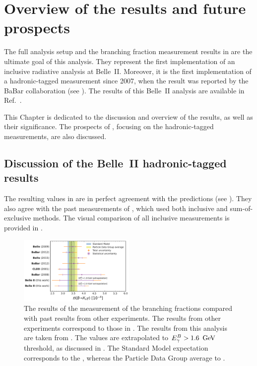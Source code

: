 \chapter{Overview of the results and future prospects}\label{ch:overview}

The full analysis setup and the branching fraction measurement results in 
are the ultimate goal of this analysis.
They represent the first implementation of an inclusive radiative analysis at Belle~II.
Moreover, it is the first implementation of a hadronic-tagged \BtoXsgamma measurement since 2007, 
when the result was reported by the BaBar collaboration (see ).
The results of this Belle~II analysis are available in Ref.~\cite{Belle-II:2022hys}.

This Chapter is dedicated to the discussion and overview of the results, as well as their significance.
The prospects of \BtoXsgamma, focusing on the hadronic-tagged measurements, are also discussed.

\section{Discussion of the Belle~II hadronic-tagged \texorpdfstring{\BtoXsgamma}{B->Xs gamma} results}\label{sec:result_discussion}

The resulting values in  are in perfect agreement with the \SM predictions (see ).
They also agree with the past measurements of \BtoXsgamma, which used both inclusive and sum-of-exclusive methods.
The visual comparison of all inclusive measurements is provided in .
\begin{figure}[hbtp!]
    \centering
    \includegraphics[width=0.5\textwidth]{figures/results_discussion/all_measurements_compared.pdf}
    \caption{\label{fig:measurement_comparison}
        The results of the measurement of the \BtoXsgamma branching fractions compared with past results from other experiments.
        The results from other experiments correspond to those in .
        The results from this analysis are taken from .
        The values are extrapolated to ${E^B_{\gamma}}>1.6~\mathrm{\,Ge\kern -0.1em V}$ threshold, as discussed in .
        The Standard Model expectation corresponds to the ,
        whereas the Particle Data Group average \cite{Workman:2022ynf} to .
    }
\end{figure}

